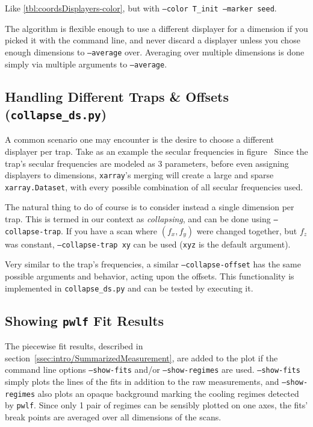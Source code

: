 \begin{table}[h]

\caption{Like \ref{tbl:coordsDisplayers-color}, but with \texttt{--color T\_init --marker seed}.}
\label{tbl:coordsDisplayers-color-marker}
\end{table}

The algorithm is flexible enough to use a different displayer for a dimension if you picked it with the command line, and never discard a displayer unless you chose enough dimensions to \texttt{--average} over. Averaging over multiple dimensions is done simply via multiple arguments to \texttt{--average}.

\subsection{Handling Different Traps \& Offsets (\texttt{collapse\_ds.py})}\label{ssec:manual/collapse_ds}

A common scenario one may encounter is the desire to choose a different displayer per trap. Take as an example the secular frequencies in figure~%
Since the trap's secular frequencies are modeled as 3 parameters, before even assigning displayers to dimensions, \texttt{xarray}'s merging will create a large and sparse \texttt{xarray.Dataset}, with every possible combination of all secular frequencies used.

The natural thing to do of course is to consider instead a single dimension per trap. This is termed in our context as \textit{collapsing}, and can be done using \texttt{--collapse-trap}. If you have a scan where $(f_x, f_y)$ were changed together, but $f_z$ was constant, \texttt{--collapse-trap xy} can be used (\texttt{xyz} is the default argument).

Very similar to the trap's frequencies, a similar \texttt{--collapse-offset} has the same possible arguments and behavior, acting upon the offsets. This functionality is implemented in \texttt{collapse\_ds.py} and can be tested by executing it.

\subsection{Showing \texttt{pwlf} Fit Results}

The piecewise fit results, described in section~\ref{ssec:intro/SummarizedMeasurement}, are added to the plot if the command line options \texttt{--show-fits} and/or \texttt{--show-regimes} are used. \texttt{--show-fits} simply plots the lines of the fits in addition to the raw measurements, and \texttt{--show-regimes} also plots an opaque background marking the cooling regimes detected by \texttt{pwlf}\cite{pwlf}. Since only 1 pair of regimes can be sensibly plotted on one axes, the fits' break points are averaged over all dimensions of the scans.


